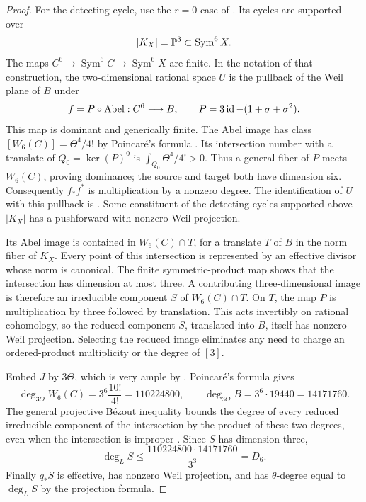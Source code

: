 \begin{proof}
For the detecting cycle, use the $r=0$ case of \cite[Theorem 2.0 and its proof, pp.~12--13]{Schoen1988}. Its cycles are supported over
\[
|K_X|=\mathbb P^3\subset\operatorname{Sym}^6X.
\]
The maps $C^6\to\operatorname{Sym}^6C\to\operatorname{Sym}^6X$ are finite. In the notation of that construction, the two-dimensional rational space $U$ is the pullback of the Weil plane of $B$ under
\[
f=P\circ\operatorname{Abel}:C^6\longrightarrow B,
\qquad P=3\operatorname{id}-(1+\sigma+\sigma^2).
\]
This map is dominant and generically finite. The Abel image has class $[W_6(C)]=\Theta^4/4!$ by Poincar\'e's formula \cite[p.~149, formulas (6)--(7)]{GriffithsPoincare1982}. Its intersection number with a translate of $Q_0=\ker(P)^0$ is $\int_{Q_0}\Theta^4/4!>0$. Thus a general fiber of $P$ meets $W_6(C)$, proving dominance; the source and target both have dimension six. Consequently $f_*f^*$ is multiplication by a nonzero degree. The identification of $U$ with this pullback is \cite[Remark 1.4, pp.~6--7; \S3, p.~24]{Schoen1988}. Some constituent of the detecting cycles supported above $|K_X|$ has a pushforward with nonzero Weil projection.

Its Abel image is contained in $W_6(C)\cap T$, for a translate $T$ of $B$ in the norm fiber of $K_X$. Every point of this intersection is represented by an effective divisor whose norm is canonical. The finite symmetric-product map shows that the intersection has dimension at most three. A contributing three-dimensional image is therefore an irreducible component $S$ of $W_6(C)\cap T$. On $T$, the map $P$ is multiplication by three followed by translation. This acts invertibly on rational cohomology, so the reduced component $S$, translated into $B$, itself has nonzero Weil projection. Selecting the reduced image eliminates any need to charge an ordered-product multiplicity or the degree of $[3]$.

Embed $J$ by $3\Theta$, which is very ample by \cite[Theorem 7.3, p.~11]{MilneAV}. Poincar\'e's formula gives
\[
\deg_{3\Theta}W_6(C)=3^6\frac{10!}{4!}=110224800,
\qquad
\deg_{3\Theta}B=3^6\cdot19440=14171760.
\]
The general projective B\'ezout inequality bounds the degree of every reduced irreducible component of the intersection by the product of these two degrees, even when the intersection is improper \cite[Example 8.4.6]{Fulton}. Since $S$ has dimension three,
\[
\deg_LS\leq\frac{110224800\cdot14171760}{3^3}=D_6.
\]
Finally $q_*S$ is effective, has nonzero Weil projection, and has $\theta$-degree equal to $\deg_LS$ by the projection formula.


\end{proof}
